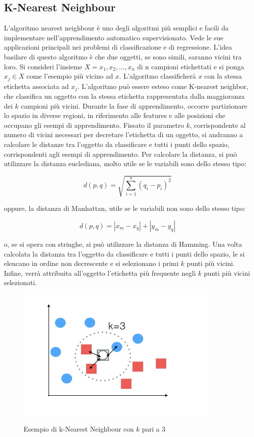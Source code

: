 \documentclass[11pt]{article}
\begin{document}
\subsection{ K-Nearest Neighbour}	
L'algoritmo nearest neighbour è uno degli algoritmi più semplici e facili da implementare nell'apprendimento automatico supervisionato. Vede le sue applicazioni principali nei problemi di classificazione e di regressione. L'idea basilare di questo algoritmo è che due oggetti, se sono simili, saranno vicini tra loro. Si consideri l'insieme $X={x_1, x_2, ..., x_n}$ di n campioni etichettati e si ponga $x_j \in X$ come l'esempio più vicino ad $x$. L'algoritmo classificherà $x$ con la stessa etichetta associata ad $x_j$. L'algoritmo può essere esteso come  K-nearest neighbor, che classifica un oggetto con la stessa etichetta rappresentata dalla maggioranza dei $k$ campioni più vicini. Durante la fase di apprendimento, occorre partizionare lo spazio in diverse regioni, in riferimento alle features e alle posizioni che occupano gli esempi di apprendimento. Fissato il parametro $k$, corrispondente al numero di vicini necessari per decretare l'etichetta di un oggetto, si andranno a calcolare le distanze tra l'oggetto da classificare e tutti i punti dello spazio, corrispondenti agli esempi di apprendimento. Per calcolare la distanza, si può utilizzare la distanza euclediana, molto utile se le variabili sono dello stesso tipo:

$$d\left( p,q\right)   = \sqrt {\sum _{i=1}^{n}  \left( q_{i}-p_{i}\right)^2 }$$

oppure, la distanza di Manhattan, utile se le variabili non sono dello stesso tipo:


$$  d\left( p,q\right) = |x_{m}-x_{q}|+|y_{m}-y_{q}| $$


o, se si opera con stringhe, si può utilizzare la distanza di Hamming. 
Una volta calcolata la distanza tra l'oggetto da classificare e tutti i punti dello spazio, le si elencano in ordine non decrescente e si selezionano i primi $k$ punti più vicini. Infine, verrà attribuita all'oggetto l'etichetta più frequente negli $k$ punti più vicini selezionati. 

\begin{figure}[h!]
\begin{center}
  \includegraphics[width=10cm]{Immagini/KNN.png}\\
  \caption{Esempio di k-Nearest Neighbour con $k$ pari a 3}
\end{center}
\end{figure}
\end{document}
